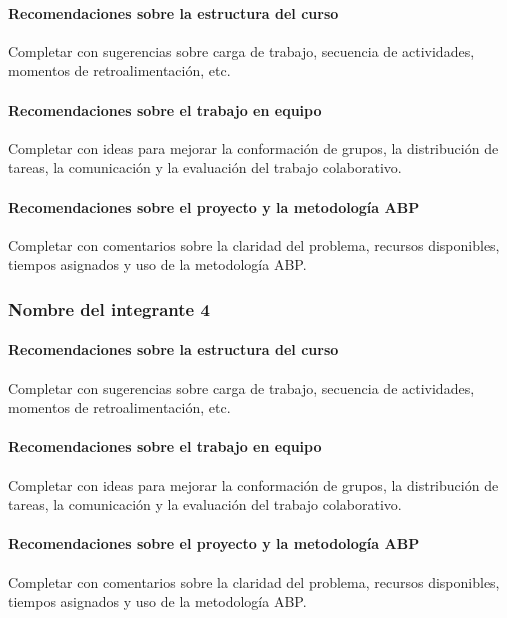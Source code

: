 \documentclass[11pt,a4paper]{article}
\begin{document}
\paragraph{Recomendaciones sobre la estructura del curso}
Completar con sugerencias sobre carga de trabajo, secuencia de actividades,
momentos de retroalimentación, etc.

\paragraph{Recomendaciones sobre el trabajo en equipo}
Completar con ideas para mejorar la conformación de grupos, la distribución
de tareas, la comunicación y la evaluación del trabajo colaborativo.

\paragraph{Recomendaciones sobre el proyecto y la metodología ABP}
Completar con comentarios sobre la claridad del problema, recursos
disponibles, tiempos asignados y uso de la metodología ABP.

\subsubsection*{Nombre del integrante 4}

\paragraph{Recomendaciones sobre la estructura del curso}
Completar con sugerencias sobre carga de trabajo, secuencia de actividades,
momentos de retroalimentación, etc.

\paragraph{Recomendaciones sobre el trabajo en equipo}
Completar con ideas para mejorar la conformación de grupos, la distribución
de tareas, la comunicación y la evaluación del trabajo colaborativo.

\paragraph{Recomendaciones sobre el proyecto y la metodología ABP}
Completar con comentarios sobre la claridad del problema, recursos
disponibles, tiempos asignados y uso de la metodología ABP.
\end{document}
